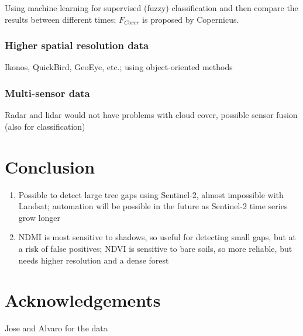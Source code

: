 \documentclass[a4paper,12pt]{scrbook}
\begin{document}
Using machine learning for supervised (fuzzy) classification and then compare the results between different times; $F_{Cover}$ is proposed by Copernicus.

\subsection{Higher spatial resolution data}

Ikonos, QuickBird, GeoEye, etc.; using object-oriented methods

\subsection{Multi-sensor data}

Radar and lidar would not have problems with cloud cover, possible sensor fusion (also for classification)

\chapter{Conclusion}

\begin{enumerate}
 \item Possible to detect large tree gaps using Sentinel-2, almost impossible with Landsat; automation will be possible in the future as Sentinel-2 time series grow longer
 \item \ac{NDMI} is most sensitive to shadows, so useful for detecting small gaps, but at a risk of false positives; \ac{NDVI} is sensitive to bare soils, so more reliable, but needs higher resolution and a dense forest
\end{enumerate}

\chapter{Acknowledgements}

Jose and Alvaro for the data

\printnoidxglossary[type=acronym]


\end{document}

